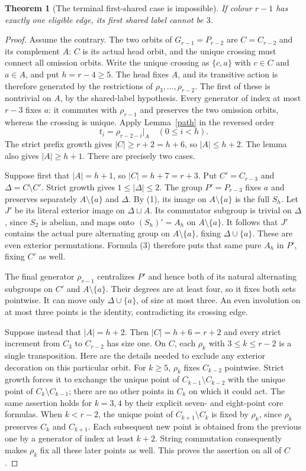 \documentclass[11pt,a4paper]{article}
\newtheorem{theorem}[lemma]{Theorem}
\begin{document}
\begin{theorem}[The terminal first-shared case is impossible]\label{end}
If colour $r-1$ has exactly one eligible edge, its first shared
label cannot be $3$.
\end{theorem}
\begin{proof}
Assume the contrary. The two orbits of $G_{r-1}=P_{r-2}$ are
$C=C_{r-2}$ and its complement $A$: $C$ is its actual head orbit,
and the unique crossing must connect all omission orbits.
Write the unique crossing as $\{c,a\}$ with $c\in C$
and $a\in A$, and put $h=r-4\geq5$. The head fixes $A$, and
its transitive action is therefore generated by the restrictions
of $\rho_3,\ldots,\rho_{r-2}$. The first of these is nontrivial
on $A$, by the shared-label hypothesis. Every generator of index
at most $r-3$ fixes $a$: it commutes with $\rho_{r-1}$ and
preserves the two omission orbits, whereas the crossing is unique.
Apply Lemma~\ref{path} in the reversed order
\[
            t_i=\rho_{r-2-i}|_A\quad(0\leq i<h).
\]
The strict prefix growth gives $|C|\geq r+2=h+6$, so
$|A|\leq h+2$. The lemma also gives $|A|\geq h+1$.
There are precisely two cases.

Suppose first that $|A|=h+1$, so $|C|=h+7=r+3$.
Put $C'=C_{r-3}$ and $\Delta=C\setminus C'$. Strict growth
gives $1\leq|\Delta|\leq2$.
The group $P'=P_{r-3}$ fixes $a$ and preserves separately
$A\setminus\{a\}$ and $\Delta$. By (1), its image on
$A\setminus\{a\}$ is the full $S_h$.
Let $J'$ be its literal exterior image on
$\Delta\sqcup A$. Its commutator subgroup is trivial on
$\Delta$, since $S_2$ is abelian, and maps onto
$(S_h)'=A_h$ on $A\setminus\{a\}$.
It follows that $J'$ contains the actual pure alternating
group on $A\setminus\{a\}$, fixing $\Delta\cup\{a\}$.
These are even exterior permutations. Formula (3) therefore
puts that same pure $A_h$ in $P'$, fixing $C'$ as well.

The final generator $\rho_{r-1}$ centralizes $P'$ and hence
both of its natural alternating subgroups on $C'$ and
$A\setminus\{a\}$. Their degrees are at least four, so it
fixes both sets pointwise. It can move only
$\Delta\cup\{a\}$, of size at most three. An even involution
on at most three points is the identity, contradicting its
crossing edge.

Suppose instead that $|A|=h+2$. Then $|C|=h+6=r+2$ and every
strict increment from $C_3$ to $C_{r-2}$ has size one.
On $C$, each $\rho_k$ with $3\leq k\leq r-2$ is a single
transposition. Here are the details needed to exclude any
exterior decoration on this particular orbit.
For $k\geq5$, $\rho_k$ fixes $C_{k-2}$ pointwise. Strict
growth forces it to exchange the unique point of
$C_{k-1}\setminus C_{k-2}$ with the unique point of
$C_k\setminus C_{k-1}$; there are no other points in $C_k$
on which it could act. The same assertion holds for $k=3,4$
by their explicit seven- and eight-point core formulas.
When $k<r-2$, the unique point of $C_{k+1}\setminus C_k$
is fixed by $\rho_k$, since $\rho_k$ preserves $C_k$ and
$C_{k+1}$. Each subsequent new point is obtained from the
previous one by a generator of index at least $k+2$.
String commutation consequently makes $\rho_k$ fix all these
later points as well. This proves the assertion on all of $C$.


\end{proof}
\end{document}
